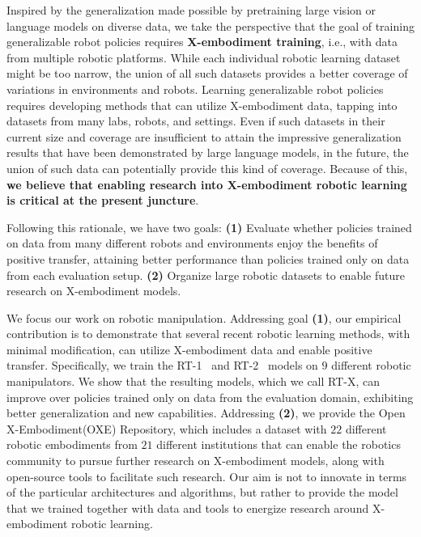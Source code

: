 \documentclass[letterpaper, 10 pt, conference]{ieeeconf}  %
\newcommand{\repoacronym}{OXE\xspace}
\newcommand{\repo}{Open X-Embodiment\xspace}     %
\newcommand{\numembodiment}{22}
\newcommand{\numinstitution}{21}
\newcommand{\cro}{X}
\newcommand{\nummanipulatorusedintraining}{9}
\begin{document}
Inspired by the generalization made possible by pretraining large vision or language models on diverse data, we take the perspective that the goal of training generalizable robot policies requires \textbf{\cro-embodiment training}, i.e., with data from multiple robotic platforms.
While each individual robotic learning dataset might be too narrow, the union of all such datasets provides a better coverage of variations in environments and robots. Learning generalizable robot policies requires developing methods that can utilize \cro-embodiment data, tapping into datasets from many labs, robots, and settings. Even if such datasets in their current size and coverage are insufficient to attain the impressive generalization results that have been demonstrated by large language models, in the future, the union of such data can potentially provide this kind of coverage. 
Because of this, \textbf{we believe that enabling research into \cro-embodiment robotic learning is critical at the present juncture}.



Following this rationale, we have two goals: \textbf{(1)} Evaluate whether policies trained on data from many different robots and environments enjoy the benefits of positive transfer, attaining better performance than policies trained only on data from each evaluation setup. \textbf{(2)} Organize large robotic datasets to enable future research on \cro-embodiment models.

We focus our work on robotic manipulation. Addressing goal \textbf{(1)}, our empirical contribution is to demonstrate that several recent robotic learning methods, with minimal modification, can utilize \cro-embodiment data and enable positive transfer. 
Specifically, we train the RT-1~\cite{brohan2023rt1} and RT-2~\cite{brohan2023rt2} models on  $\nummanipulatorusedintraining$ different robotic manipulators.
We show that the resulting models, which we call RT-X, can improve over policies trained only on data from the evaluation domain, exhibiting better generalization and new capabilities. Addressing \textbf{(2)}, we provide the \repo (\repoacronym) Repository, which includes a dataset with $\numembodiment$ different robotic embodiments from $\numinstitution$ different institutions that can enable the robotics community to pursue further research on \cro-embodiment models, along with open-source tools to facilitate such research. Our aim is not to innovate in terms of the particular architectures and algorithms, but rather to provide the model that we trained together with data and tools to energize research around \cro-embodiment robotic learning.
\end{document}
